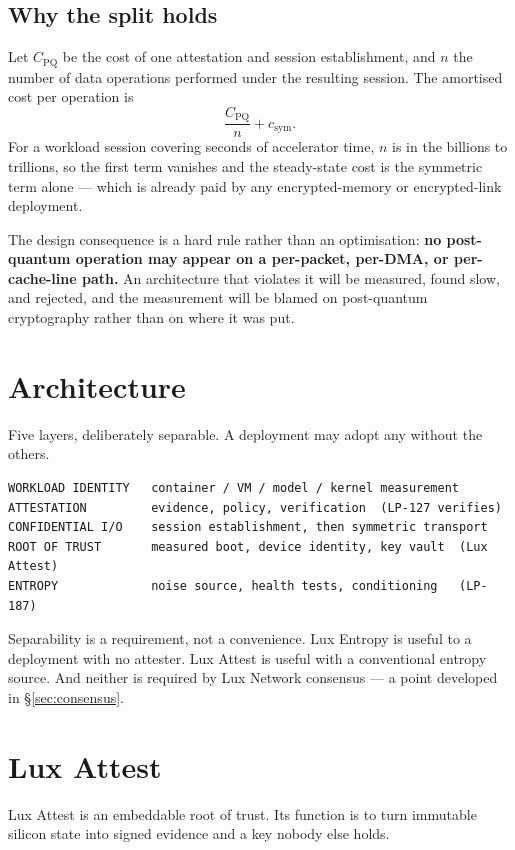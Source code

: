 \documentclass[11pt,a4paper]{article}
\begin{document}
\subsection{Why the split holds}

Let $C_{\mathrm{PQ}}$ be the cost of one attestation and session establishment,
and $n$ the number of data operations performed under the resulting session.
The amortised cost per operation is
\[
\frac{C_{\mathrm{PQ}}}{n} + c_{\mathrm{sym}} .
\]
For a workload session covering seconds of accelerator time, $n$ is in the
billions to trillions, so the first term vanishes and the steady-state cost is
the symmetric term alone --- which is already paid by any encrypted-memory or
encrypted-link deployment.

The design consequence is a hard rule rather than an optimisation: \textbf{no
post-quantum operation may appear on a per-packet, per-DMA, or per-cache-line
path.} An architecture that violates it will be measured, found slow, and
rejected, and the measurement will be blamed on post-quantum cryptography
rather than on where it was put.

\section{Architecture}

Five layers, deliberately separable. A deployment may adopt any without the
others.

\begin{lstlisting}
WORKLOAD IDENTITY   container / VM / model / kernel measurement
ATTESTATION         evidence, policy, verification  (LP-127 verifies)
CONFIDENTIAL I/O    session establishment, then symmetric transport
ROOT OF TRUST       measured boot, device identity, key vault  (Lux Attest)
ENTROPY             noise source, health tests, conditioning   (LP-187)
\end{lstlisting}

Separability is a requirement, not a convenience. Lux Entropy is useful to a
deployment with no attester. Lux Attest is useful with a conventional entropy
source. And neither is required by Lux Network consensus --- a point developed
in \S\ref{sec:consensus}.

\section{Lux Attest}

Lux Attest is an embeddable root of trust. Its function is to turn immutable
silicon state into signed evidence and a key nobody else holds.
\end{document}
